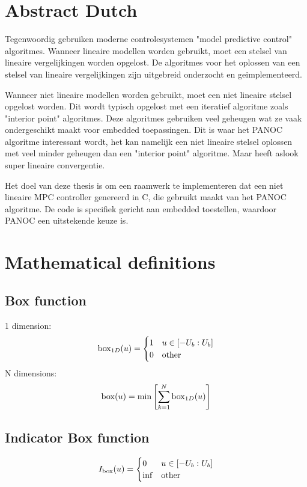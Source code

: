 \chapter{Abstract Dutch}
Tegenwoordig gebruiken moderne controlesystemen "model predictive control" algoritmes. Wanneer lineaire modellen worden gebruikt, moet een stelsel van lineaire vergelijkingen worden opgelost. De algoritmes voor het oplossen van een stelsel van lineaire vergelijkingen zijn uitgebreid onderzocht en geimplementeerd. 

Wanneer niet lineaire modellen worden gebruikt, moet een niet lineaire stelsel opgelost worden. Dit wordt typisch opgelost met een iteratief algoritme zoals "interior point" algoritmes. Deze algoritmes gebruiken veel geheugen wat ze vaak ondergeschikt maakt voor embedded toepassingen. Dit is waar het PANOC algoritme interessant wordt, het kan namelijk een niet lineaire stelsel oplossen met veel minder geheugen dan een "interior point" algoritme. Maar heeft aslook super lineaire convergentie.

Het doel van deze thesis is om een raamwerk te implementeren dat een niet lineaire MPC controller genereerd in C, die gebruikt maakt van het PANOC algoritme. De code is specifiek gericht aan embedded toestellen, waardoor PANOC een uitstekende keuze is. 


\chapter{Mathematical definitions}
	\section{Box function}
	\label{appendix:box function}
		1 dimension:
		\begin{equation}
			\operatorname{box}_{1D}(u) =
			\begin{cases}
				 1 & u \in [-U_b:U_b]\\
				 0 & \operatorname{other}
			\end{cases}
			\label{eq:box function 1 dimension}
		\end{equation}
		N dimensions:
		\begin{equation}
			\operatorname{box}(u) = \min\left[ \sum_{k=1}^ N \operatorname{box}_{1D}(u) \right]
			\label{eq:box function N dimensions}
		\end{equation}
	\section{Indicator Box function}
	\label{appendix:indicator box function}
		\begin{equation}
			I_{\operatorname{box}}(u)=
			\begin{cases}
				0 & u \in [-U_b:U_b]\\
				\inf & \operatorname{other}
			\end{cases}
		\end{equation}
		
